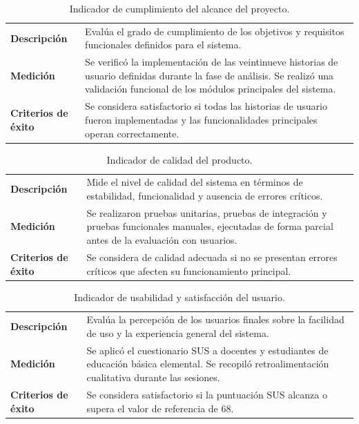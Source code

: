 \begin{table}[H]
\centering
\caption{Indicador de cumplimiento del alcance del proyecto.}
\label{tab:ind_alcance}
\begin{tabularx}{\textwidth}{|L{3.5cm}|X|}
\hline
{}
 & \\
\hline
\textbf{Descripción} & Evalúa el grado de cumplimiento de los objetivos y requisitos funcionales definidos para el sistema.\\
\hline
\textbf{Medición} & Se verificó la implementación de las veintinueve historias de usuario definidas durante la fase de análisis. Se realizó una validación funcional de los módulos principales del sistema.\\
\hline
\textbf{Criterios de éxito} & Se considera satisfactorio si todas las historias de usuario fueron implementadas y las funcionalidades principales operan correctamente.\\
\hline
\end{tabularx}
\fuenteautor
\end{table}

\begin{table}[H]
\centering
\caption{Indicador de calidad del producto.}
\label{tab:ind_calidad}
\begin{tabularx}{\textwidth}{|L{3.5cm}|X|}
\hline
{}
 & \\
\hline
\textbf{Descripción} & Mide el nivel de calidad del sistema en términos de estabilidad, funcionalidad y ausencia de errores críticos.\\
\hline
\textbf{Medición} & Se realizaron pruebas unitarias, pruebas de integración y pruebas funcionales manuales, ejecutadas de forma parcial antes de la evaluación con usuarios.\\
\hline
\textbf{Criterios de éxito} & Se considera de calidad adecuada si no se presentan errores críticos que afecten su funcionamiento principal.\\
\hline
\end{tabularx}
\fuenteautor
\end{table}

\begin{table}[H]
\centering
\caption{Indicador de usabilidad y satisfacción del usuario.}
\label{tab:ind_usabilidad}
\begin{tabularx}{\textwidth}{|L{3.5cm}|X|}
\hline
{}
 & \\
\hline
\textbf{Descripción} & Evalúa la percepción de los usuarios finales sobre la facilidad de uso y la experiencia general del sistema.\\
\hline
\textbf{Medición} & Se aplicó el cuestionario SUS a docentes y estudiantes de educación básica elemental. Se recopiló retroalimentación cualitativa durante las sesiones.\\
\hline
\textbf{Criterios de éxito} & Se considera satisfactorio si la puntuación SUS alcanza o supera el valor de referencia de 68.\\
\hline
\end{tabularx}
\fuenteautor
\end{table}

